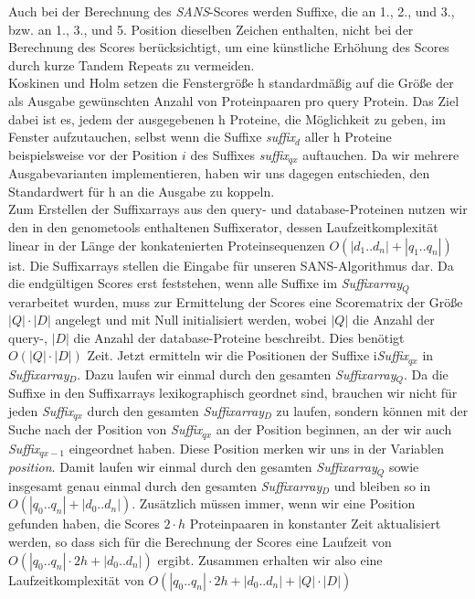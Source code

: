 \documentclass{article}
\begin{document}
Auch bei der Berechnung des \emph{SANS}-Scores werden Suffixe, die an 1., 2., und 3., bzw. an 1., 3., und 5. Position dieselben Zeichen enthalten, nicht bei der Berechnung des Scores berücksichtigt, um eine künstliche Erhöhung des Scores durch kurze Tandem Repeats zu vermeiden.\\
Koskinen und Holm setzen die Fenstergröße h standardmäßig auf die Größe der als
Ausgabe gewünschten Anzahl von Proteinpaaren pro query Protein. 
Das Ziel dabei ist es, jedem der ausgegebenen h Proteine, die Möglichkeit zu
geben, im Fenster aufzutauchen, selbst wenn die Suffixe \emph{suffix$_{d}$}
aller h Proteine beispielsweise vor der Position $i$ des Suffixes
\emph{suffix$_{qx}$} auftauchen. 
Da wir mehrere Ausgabevarianten implementieren, haben wir uns dagegen entschieden, den Standardwert für h an die Ausgabe zu koppeln.\\
Zum Erstellen der Suffixarrays aus den query- und database-Proteinen nutzen wir
den in den genometools enthaltenen Suffixerator, dessen Laufzeitkomplexität
linear in der Länge der konkatenierten Proteinsequenzen $O(|d_1..d_n|+|q_1..q_n|)$ ist.
Die Suffixarrays stellen die Eingabe für unseren SANS-Algorithmus dar.
Da die endgültigen Scores erst feststehen, wenn alle Suffixe im
\emph{Suffixarray$_Q$}
verarbeitet wurden, muss zur Ermittelung der Scores eine Scorematrix der Größe
$|Q|\cdot|D|$ angelegt und mit Null initialisiert werden, wobei $|Q|$ die Anzahl
der query-, $|D|$ die Anzahl der database-Proteine beschreibt. Dies benötigt
$O(|Q|\cdot|D|)$ Zeit. Jetzt ermitteln wir die Positionen der Suffixe
i\emph{Suffix$_{qx}$} in \emph{Suffixarray$_D$}. Dazu laufen wir einmal durch
den gesamten \emph{Suffixarray$_Q$}. Da die Suffixe in den Suffixarrays
lexikographisch geordnet sind, brauchen wir nicht für jeden \emph{Suffix$_{qx}$}
durch den gesamten \emph{Suffixarray$_D$} zu laufen, sondern können mit der
Suche nach der Position von \emph{Suffix$_{qx}$} an der Position beginnen, an
der wir auch \emph{Suffix$_{qx-1}$} eingeordnet haben. Diese Position merken wir
uns in der Variablen \emph{position}. Damit laufen wir einmal durch den gesamten
\emph{Suffixarray$_Q$} sowie insgesamt genau einmal durch den gesamten
\emph{Suffixarray$_D$} und bleiben so in $O(|q_0..q_n| + |d_0..d_n|)$.
Zusätzlich müssen immer, wenn wir eine Position gefunden haben, die Scores $2
\cdot h$ Proteinpaaren in konstanter Zeit aktualisiert werden, so dass sich für
die Berechnung der Scores eine Laufzeit von ${O(|q_0..q_n|\cdot2h +
|d_0..d_n|)}$ ergibt. Zusammen erhalten wir also eine Laufzeitkomplexität von ${O(|q_0..q_n|\cdot2h + |d_0..d_n|+|Q|\cdot|D|)}$
\end{document}
